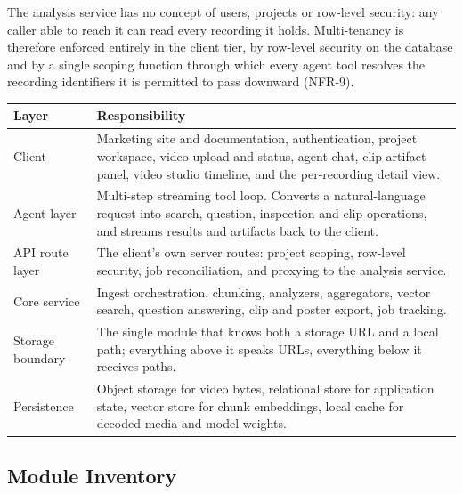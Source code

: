 The analysis service has no concept of users, projects or row-level security: any
caller able to reach it can read every recording it holds. Multi-tenancy is therefore
enforced entirely in the client tier, by row-level security on the database and by a
single scoping function through which every agent tool resolves the recording
identifiers it is permitted to pass downward (NFR-9).

\begin{table}[htbp]
\centering
\small
\begin{tabularx}{\textwidth}{@{}L{3.2cm}X@{}}
\toprule
\textbf{Layer} & \textbf{Responsibility} \\
\midrule
Client            & Marketing site and documentation, authentication, project workspace, video upload and status, agent chat, clip artifact panel, video studio timeline, and the per-recording detail view. \\
Agent layer       & Multi-step streaming tool loop. Converts a natural-language request into search, question, inspection and clip operations, and streams results and artifacts back to the client. \\
API route layer   & The client's own server routes: project scoping, row-level security, job reconciliation, and proxying to the analysis service. \\
Core service      & Ingest orchestration, chunking, analyzers, aggregators, vector search, question answering, clip and poster export, job tracking. \\
Storage boundary  & The single module that knows both a storage URL and a local path; everything above it speaks URLs, everything below it receives paths. \\
Persistence       & Object storage for video bytes, relational store for application state, vector store for chunk embeddings, local cache for decoded media and model weights. \\
\bottomrule
\end{tabularx}
\end{table}

\subsection{Module Inventory}

